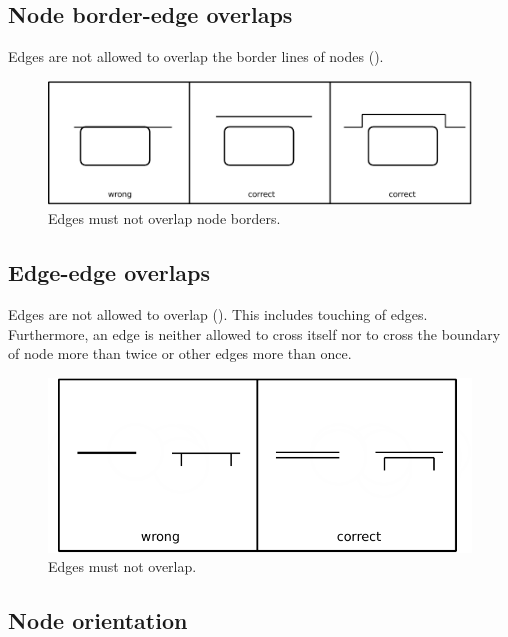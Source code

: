 \subsection{Node border-edge overlaps}

Edges are not allowed to overlap the border lines of nodes ().

\begin{figure}[htb]
  \centering
  \includegraphics[scale=0.8]{images/build/layout_node_border_edge.pdf}
  \caption{Edges must not overlap node borders.}\label{fig:layout3}
\end{figure}

\subsection{Edge-edge overlaps}

Edges are not allowed to overlap (). This includes touching of edges.
Furthermore, an edge is neither allowed to cross itself nor to cross
the boundary of node more than twice or other edges more than once.

\begin{figure}[htb]
  \centering
  \includegraphics[scale=0.8]{images/build/layout_edge_edge.pdf}
  \caption{Edges must not overlap.}\label{fig:layout4}
\end{figure}

\subsection{Node orientation}


